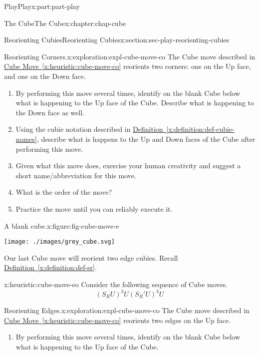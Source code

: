 \documentclass[oneside,10pt,]{book}
\newcommand{\xreffont}{\relax}
\numberwithin{equation}{section}
\begin{document}
\begin{partptx}{Play}{}{Play}{}{}{x:part:part-play}
\begin{chapterptx}{The Cube}{}{The Cube}{}{}{x:chapter:chap-cube}
\begin{sectionptx}{Reorienting Cubies}{}{Reorienting Cubies}{}{}{x:section:sec-play-reorienting-cubies}
\begin{exploration}{Reorienting Corners.}{x:exploration:expl-cube-move-co}%
The Cube move described in \hyperref[x:heuristic:cube-move-co]{Cube Move~{\xreffont\ref{x:heuristic:cube-move-co}}} reorients two corners: one on the Up face, and one on the Down face.%
%
\begin{enumerate}
\item{}By performing this move several times, identify on the blank Cube below what is happening to the Up face of the Cube. Describe what is happening to the Down face as well.%
\item{}Using the cubie notation described in \hyperref[x:definition:def-cubie-names]{Definition~{\xreffont\ref{x:definition:def-cubie-names}}}, describe what is happens to the Up and Down faces of the Cube after performing this move.%
\item{}Given what this move does, exercise your human creativity and suggest a short name\slash{}abbreviation for this move.%
\item{}What is the order of the move?%
\item{}Practice the move until you can reliably execute it.%
\end{enumerate}
\begin{figureptx}{A blank cube.}{x:figure:fig-cube-move-e}{}%
\begin{image}{0.25}{0.5}{0.25}%
\texttt{[image: ./images/grey\_cube.svg]}
\end{image}%
\tcblower
\end{figureptx}%
\end{exploration}%
Our last Cube move will reorient two edge cubies. Recall \hyperref[x:definition:def-sr]{Definition~{\xreffont\ref{x:definition:def-sr}}}.%
\begin{heuristic}{}{}{x:heuristic:cube-move-eo}%
%
Consider the following sequence of Cube moves.%
%
\begin{equation*}
(S_R U)^3 U (S_R ' U)^3 U
\end{equation*}
\end{heuristic}
\begin{exploration}{Reorienting Edges.}{x:exploration:expl-cube-move-co}%
The Cube move described in \hyperref[x:heuristic:cube-move-co]{Cube Move~{\xreffont\ref{x:heuristic:cube-move-co}}} reorients two edges on the Up face.%
%
\begin{enumerate}
\item{}By performing this move several times, identify on the blank Cube below what is happening to the Up face of the Cube.%

\end{enumerate}
\end{exploration}
\end{sectionptx}
\end{chapterptx}
\end{partptx}
\end{document}
